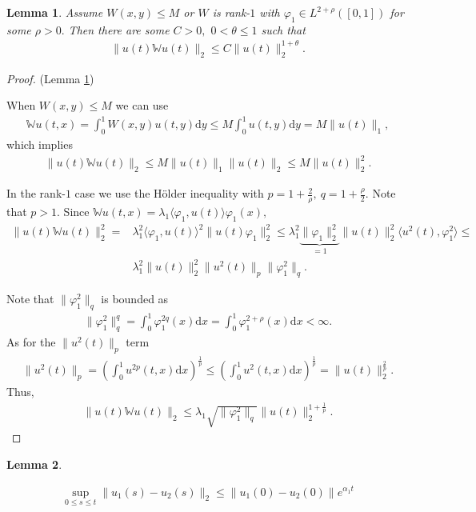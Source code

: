 \documentclass{article}
\renewcommand{\d}{\mathrm{d}}
\newcommand{\W}{\mathbb{W}}
\newcommand{\1}[1]{{\mathds{1}}_{\left\{#1\right\}}}
\newtheorem{lemma}{Lemma}
\begin{document}
\begin{lemma}
\label{l:bilinear}
Assume $W(x,y) \leq M$ or $W$ is rank-$1$ with $\varphi_1 \in L^{2+\rho}([0,1])$ for some $\rho>0.$ Then there are some $C>0,$ $0<\theta \leq 1$ such that
\begin{align*}
 \| u(t)\W u(t)\|_2 \leq C \| u(t)\|_2^{1+\theta}.	
\end{align*}
\end{lemma}

\begin{proof}(Lemma \ref{l:bilinear})

When $W(x,y) \leq M$ we can use
\begin{align*}
\W u(t,x)=\int_{0}^{1} W(x,y) u(t,y) \d y \leq M \int_{0}^{1} u(t,y)  \d y =M \|u(t) \|_1 ,	
\end{align*}
which implies
\begin{align*}
\|u(t) \W u(t) \|_2 \leq M \| u(t)\|_1 \|u(t) \|_2 \leq M \|u(t) \|_2^2.
\end{align*}

In the rank-$1$ case we use the Hölder inequality with $p=1+\frac{2}{\rho}, \ q=1+\frac{\rho}{2}.$ Note that $p>1$. Since $\W u(t,x)= \lambda_1\langle \varphi_1, u(t) \rangle \varphi_1(x),$
\begin{align*}
\|u(t)\W u(t) \|_2^2=&\lambda_1^2 \langle \varphi_1, u(t) \rangle^2 \| u(t) \varphi_1 \|_2^2 \leq \lambda_1^2 \underbrace{\|\varphi_1 \|_2^2}_{=1} \|u(t) \|_2^2  \langle u^2(t), \varphi_1^2 \rangle \leq \\
&\lambda_1^2 \|u(t) \|_2^2   \|u^2(t) \|_p \|\varphi_1^2 \|_q.
\end{align*} 

Note that $\|\varphi_1^2 \|_q$ is bounded as
\begin{align*}
\|\varphi_1^2 \|_q^{q}=\int_{0}^{1} \varphi_1^{2q}(x) \d x=\int_{0}^{1}\varphi_1^{2+\rho}(x) \d x<\infty.
\end{align*}
As for the $\|u^2(t) \|_p$ term
\begin{align*}
\|u^2(t) \|_p=\left(\int_{0}^{1} u^{2p}(t,x) \d x \right)^{\frac{1}{p}} \leq \left(\int_{0}^{1} u^{2}(t,x) \d x \right)^{\frac{1}{p}}= \| u(t)\|_2^{\frac{2}{p}}. 
\end{align*}
Thus,
\begin{align*}
\|u(t)\W u(t) \|_2 \leq \lambda_1 \sqrt{ \|\varphi_1^2 \|_q} \|u(t) \|_{2}^{1+\frac{1}{p}}.
\end{align*}
\end{proof}

\begin{lemma}
	\label{l:elsilon_0_error}
	
	\begin{align*}
		\sup_{0 \leq s \leq t} \|u_1(s)-u_2(s) \|_2 \leq \|u_1(0)-u_2(0) \|e^{\alpha_1 t}
	\end{align*}	
\end{lemma}
\end{document}
